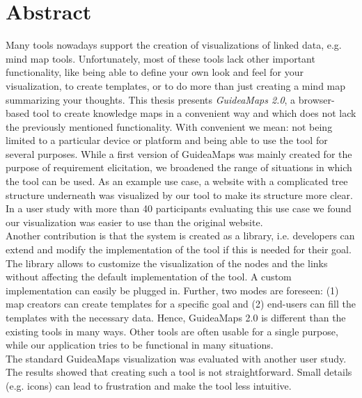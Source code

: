 \section*{Abstract}%

Many tools nowadays support the creation of visualizations of linked data, e.g. mind map tools. Unfortunately, most of these tools lack other important functionality, like being able to define your own look and feel for your visualization, to create templates, or to do more than just creating a mind map summarizing your thoughts. This thesis presents \textit{GuideaMaps 2.0}, a browser-based tool to create knowledge maps in a convenient way and which does not lack the previously mentioned functionality. With convenient we mean: not being limited to a particular device or platform and being able to use the tool for several purposes. While a first version of GuideaMaps was mainly created for the purpose of requirement elicitation, we broadened the range of situations in which the tool can be used. As an example use case, a website with a complicated tree structure underneath was visualized by our tool to make its structure more clear. In a user study with more than 40 participants evaluating this use case we found our visualization was easier to use than the original website.\\

Another contribution is that the system is created as a library, i.e. developers can extend and modify the implementation of the tool if this is needed for their goal. The library allows to customize the visualization of the nodes and the links without affecting the default implementation of the tool. A custom implementation can easily be plugged in. Further, two modes are foreseen: (1) map creators can create templates for a specific goal and (2) end-users can fill the templates with the necessary data. Hence, GuideaMaps 2.0 is different than the existing tools in many ways. Other tools are often usable for a single purpose, while our application tries to be functional in many situations.\\

The standard GuideaMaps visualization was evaluated with another user study. The results showed that creating such a tool is not straightforward. Small details (e.g. icons) can lead to frustration and make the tool less intuitive.